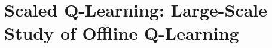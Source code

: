 \documentclass[../thesis.tex]{subfiles}
\begin{document}



% 


\section{Scaled Q-Learning: Large-Scale Study of Offline Q-Learning}

\end{document}
